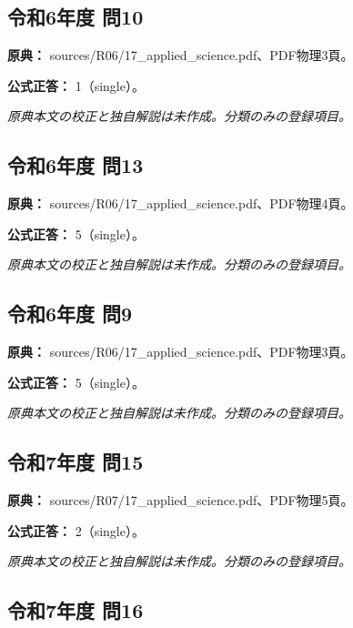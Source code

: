 \subsection{令和6年度 問10}
\label{q:r06-reg-applied-10}

\noindent\textbf{原典：} sources/R06/17\_applied\_science.pdf、PDF物理3頁。

\textbf{公式正答：} 1（single）。

\par\textit{原典本文の校正と独自解説は未作成。分類のみの登録項目。}

\subsection{令和6年度 問13}
\label{q:r06-reg-applied-13}

\noindent\textbf{原典：} sources/R06/17\_applied\_science.pdf、PDF物理4頁。

\textbf{公式正答：} 5（single）。

\par\textit{原典本文の校正と独自解説は未作成。分類のみの登録項目。}

\subsection{令和6年度 問9}
\label{q:r06-reg-applied-09}

\noindent\textbf{原典：} sources/R06/17\_applied\_science.pdf、PDF物理3頁。

\textbf{公式正答：} 5（single）。

\par\textit{原典本文の校正と独自解説は未作成。分類のみの登録項目。}

\subsection{令和7年度 問15}
\label{q:r07-reg-applied-15}

\noindent\textbf{原典：} sources/R07/17\_applied\_science.pdf、PDF物理5頁。

\textbf{公式正答：} 2（single）。

\par\textit{原典本文の校正と独自解説は未作成。分類のみの登録項目。}

\subsection{令和7年度 問16}
\label{q:r07-reg-applied-16}

